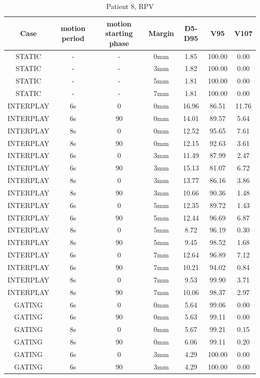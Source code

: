 \documentclass[type=dr, dr=rernat, accentcolor=tud7b,colorbacktitle, bigchapter, openright, twoside, 12pt ]{tudthesis}
\begin{document}
\begin{table}[H]
  \centering
  \caption{Patient 8, RPV}
   \begin{tabular}{|c||c|c|c||c|c|c|}
    \hline\hline
    Case & motion period & motion starting phase & Margin & D5-D95 & V95 & V107\\
    \hline 
STATIC & - & - & 0mm & 1.85 & 100.00 & 0.00 \\
STATIC & - & - & 3mm & 1.82 & 100.00 & 0.00 \\
STATIC & - & - & 5mm & 1.81 & 100.00 & 0.00 \\
STATIC & - & - & 7mm & 1.81 & 100.00 & 0.00 \\
INTERPLAY & 6s & 0 & 0mm & 16.96 & 86.51 & 11.76 \\
INTERPLAY & 6s & 90 & 0mm & 14.01 & 89.57 & 5.64 \\
INTERPLAY & 8s & 0 & 0mm & 12.52 & 95.65 & 7.61 \\
INTERPLAY & 8s & 90 & 0mm & 12.15 & 92.63 & 3.61 \\
INTERPLAY & 6s & 0 & 3mm & 11.49 & 87.99 & 2.47 \\
INTERPLAY & 6s & 90 & 3mm & 15.13 & 81.07 & 6.72 \\
INTERPLAY & 8s & 0 & 3mm & 13.77 & 86.16 & 3.86 \\
INTERPLAY & 8s & 90 & 3mm & 10.66 & 90.36 & 1.48 \\
INTERPLAY & 6s & 0 & 5mm & 12.35 & 89.72 & 1.43 \\
INTERPLAY & 6s & 90 & 5mm & 12.44 & 96.69 & 6.87 \\
INTERPLAY & 8s & 0 & 5mm & 8.72 & 96.19 & 0.30 \\
INTERPLAY & 8s & 90 & 5mm & 9.45 & 98.52 & 1.68 \\
INTERPLAY & 6s & 0 & 7mm & 12.64 & 96.89 & 7.12 \\
INTERPLAY & 6s & 90 & 7mm & 10.21 & 94.02 & 0.84 \\
INTERPLAY & 8s & 0 & 7mm & 9.53 & 99.90 & 3.71 \\
INTERPLAY & 8s & 90 & 7mm & 10.06 & 98.37 & 2.97 \\
GATING & 6s & 0 & 0mm & 5.64 & 99.06 & 0.00 \\
GATING & 6s & 90 & 0mm & 5.63 & 99.11 & 0.00 \\
GATING & 8s & 0 & 0mm & 5.67 & 99.21 & 0.15 \\
GATING & 8s & 90 & 0mm & 6.06 & 99.11 & 0.20 \\
GATING & 6s & 0 & 3mm & 4.29 & 100.00 & 0.00 \\
GATING & 6s & 90 & 3mm & 4.29 & 100.00 & 0.00 \\

\end{tabular}
\end{table}
\end{document}
